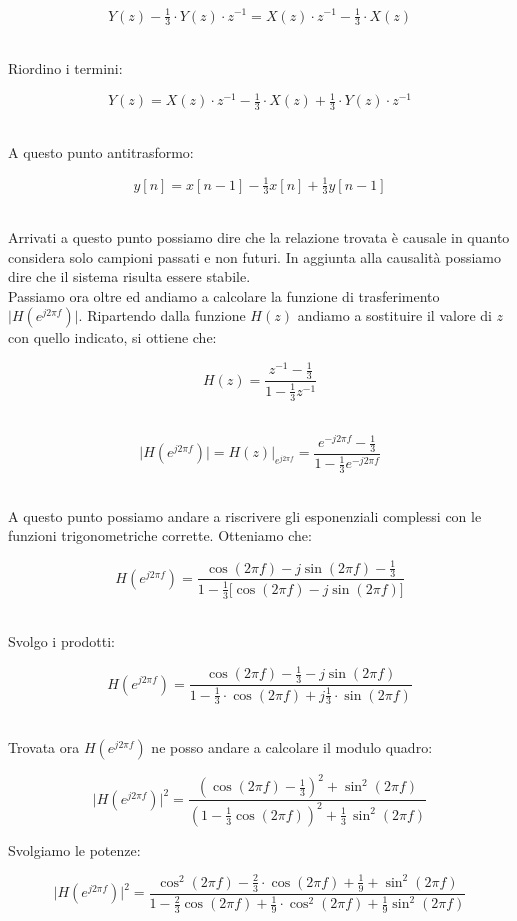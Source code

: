 \documentclass[../main.tex]{subfiles}
\begin{document}
\[ Y(z) - \tfrac{1}{3} \cdot Y(z) \cdot  z^{-1} =  X(z) \cdot z^{-1} - \tfrac{1}{3}\cdot  X(z) \]\

Riordino i termini:

\[ Y(z)  =  X(z) \cdot z^{-1} - \tfrac{1}{3}\cdot  X(z) + \tfrac{1}{3} \cdot Y(z) \cdot  z^{-1} \]\

A questo punto antitrasformo:

\[y[n] = x[n-1] - \tfrac{1}{3}x[n] + \tfrac{1}{3}y[n-1]  \]\

Arrivati a questo punto possiamo dire che la relazione trovata è causale in quanto considera solo campioni passati e non futuri.
In aggiunta alla causalità possiamo dire che il sistema risulta essere stabile.\\

Passiamo ora oltre ed andiamo a calcolare la funzione di trasferimento $\big|H(e^{j2\pi f})\big|$.
Ripartendo dalla funzione $H(z)$ andiamo a sostituire il valore di $z$ con quello indicato, si ottiene che:

\[  H(z) = \frac{z^{-1} - \frac{1}{3}}{1 - \frac{1}{3} z^{-1}}  \]\

\[ \big|H(e^{j2\pi f})\big| = H(z)\big|_{e^{j2\pi f}}  =  \frac{e^{-j2\pi f} - \frac{1}{3}}{1 - \frac{1}{3} e^{-j2\pi f}}\]\

A questo punto possiamo andare a riscrivere gli esponenziali complessi con le funzioni trigonometriche corrette. Otteniamo che:

\[ H(e^{j2\pi f})  = \frac{\cos(2\pi f) - j \sin(2\pi f) - \tfrac{1}{3}}{1 - \tfrac{1}{3} \big[ \cos(2\pi f) - j \sin(2\pi f) \big]} \]\

Svolgo i prodotti:


\[ H(e^{j2\pi f})  = \frac{\cos(2\pi f) - \tfrac{1}{3}  - j \sin(2\pi f) }{1 - \tfrac{1}{3} \cdot \cos(2\pi f) + j \tfrac{1}{3} \cdot \sin(2\pi f)} \]\

Trovata ora $H(e^{j2\pi f})$ ne posso andare a calcolare il modulo quadro:

\[ \big| H(e^{j 2 \pi f}) \big|^2 = \frac{ \left( \cos(2\pi f) - \tfrac{1}{3} \right)^2 + \sin^2(2\pi f) }{ \left( 1 - \tfrac{1}{3} \cos(2\pi f) \right)^2 + \tfrac{1}{3} \, \sin^2(2\pi f) } \]

Svolgiamo le potenze:

\[ \big| H(e^{j 2 \pi f}) \big|^2 = \frac{ \cos^2(2\pi f) - \tfrac{2}{3} \cdot \cos(2\pi f) + \tfrac{1}{9} + \sin^2(2\pi f) }{  1 - \tfrac{2}{3} \cos(2\pi f) + \tfrac{1}{9} \cdot \cos^2(2\pi f)  + \tfrac{1}{9}  \sin^2(2\pi f) } \]
\end{document}
